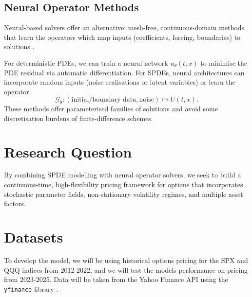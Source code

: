 \documentclass{article}
\begin{document}
\subsection{Neural Operator Methods}
Neural-based solvers offer an alternative: mesh-free, continuous-domain methods that learn the operators which map inputs (coefficients, forcing, boundaries) to solutions \citep{shen2025neuralsdesunifiedapproach}.

For deterministic PDEs, we can train a neural network \(u_\theta(t,x)\) to minimise the PDE residual via automatic differentiation. For SPDEs, neural architectures can incorporate random inputs (noise realisations or latent variables) or learn the operator \citep{salvi2022neuralstochasticpdesresolutioninvariant}
\[
    \mathcal G_\theta: (\text{initial/boundary data}, \text{noise}) \mapsto U(t,x).
\]
These methods offer parameterised families of solutions and avoid some discretisation burdens of finite-difference schemes.

\section{Research Question}
By combining SPDE modelling with neural operator solvers, we seek to build a continuous-time, high-flexibility pricing framework for options that incorporates stochastic parameter fields, non-stationary volatility regimes, and multiple asset factors.

\section{Datasets}
To develop the model, we will be using historical options pricing for the SPX and QQQ indices from 2012-2022, and we will test the models performance on pricing from 2023-2025. Data will be taken from the Yahoo Finance API using the \texttt{yfinance} library \citep{aroussi_nodate_yfinance}.





\end{document}
